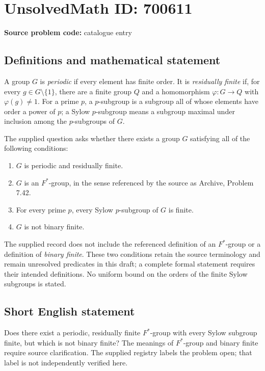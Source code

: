 \documentclass[11pt]{article}
\begin{document}
\section*{UnsolvedMath ID: 700611}
\textbf{Source problem code:} catalogue entry
\subsection{Definitions and mathematical statement}
A group \(G\) is \emph{periodic} if every element has finite order. It is \emph{residually finite} if, for every \(g\in G\setminus\{1\}\), there are a finite group \(Q\) and a homomorphism \(\varphi:G\to Q\) with \(\varphi(g)\ne 1\). For a prime \(p\), a \(p\)-subgroup is a subgroup all of whose elements have order a power of \(p\); a Sylow \(p\)-subgroup means a subgroup maximal under inclusion among the \(p\)-subgroups of \(G\).

The supplied question asks whether there exists a group \(G\) satisfying all of the following conditions:
\begin{enumerate}
\item \(G\) is periodic and residually finite.
\item \(G\) is an \(F^{*}\)-group, in the sense referenced by the source as Archive, Problem 7.42.
\item For every prime \(p\), every Sylow \(p\)-subgroup of \(G\) is finite.
\item \(G\) is not binary finite.
\end{enumerate}
The supplied record does not include the referenced definition of an \(F^{*}\)-group or a definition of \emph{binary finite}. These two conditions retain the source terminology and remain unresolved predicates in this draft; a complete formal statement requires their intended definitions. No uniform bound on the orders of the finite Sylow subgroups is stated.
\subsection{Short English statement}
Does there exist a periodic, residually finite \(F^{*}\)-group with every Sylow subgroup finite, but which is not binary finite? The meanings of \(F^{*}\)-group and binary finite require source clarification. The supplied registry labels the problem open; that label is not independently verified here.
\end{document}
